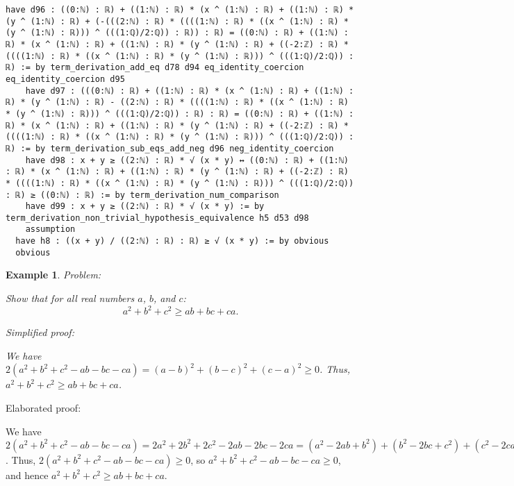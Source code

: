\documentclass{article}
\newtheorem{example}{Example}
\begin{document}
\begin{tcolorbox}[colback=white!10, width=\linewidth]
\begin{lstlisting}[language=Lean4]
    have d96 : ((0:ℕ) : ℝ) + ((1:ℕ) : ℝ) * (x ^ (1:ℕ) : ℝ) + ((1:ℕ) : ℝ) * (y ^ (1:ℕ) : ℝ) + (-(((2:ℕ) : ℝ) * ((((1:ℕ) : ℝ) * ((x ^ (1:ℕ) : ℝ) * (y ^ (1:ℕ) : ℝ))) ^ (((1:ℚ)/2:ℚ)) : ℝ)) : ℝ) = ((0:ℕ) : ℝ) + ((1:ℕ) : ℝ) * (x ^ (1:ℕ) : ℝ) + ((1:ℕ) : ℝ) * (y ^ (1:ℕ) : ℝ) + ((-2:ℤ) : ℝ) * ((((1:ℕ) : ℝ) * ((x ^ (1:ℕ) : ℝ) * (y ^ (1:ℕ) : ℝ))) ^ (((1:ℚ)/2:ℚ)) : ℝ) := by term_derivation_add_eq d78 d94 eq_identity_coercion eq_identity_coercion d95
    have d97 : (((0:ℕ) : ℝ) + ((1:ℕ) : ℝ) * (x ^ (1:ℕ) : ℝ) + ((1:ℕ) : ℝ) * (y ^ (1:ℕ) : ℝ) - ((2:ℕ) : ℝ) * ((((1:ℕ) : ℝ) * ((x ^ (1:ℕ) : ℝ) * (y ^ (1:ℕ) : ℝ))) ^ (((1:ℚ)/2:ℚ)) : ℝ) : ℝ) = ((0:ℕ) : ℝ) + ((1:ℕ) : ℝ) * (x ^ (1:ℕ) : ℝ) + ((1:ℕ) : ℝ) * (y ^ (1:ℕ) : ℝ) + ((-2:ℤ) : ℝ) * ((((1:ℕ) : ℝ) * ((x ^ (1:ℕ) : ℝ) * (y ^ (1:ℕ) : ℝ))) ^ (((1:ℚ)/2:ℚ)) : ℝ) := by term_derivation_sub_eqs_add_neg d96 neg_identity_coercion
    have d98 : x + y ≥ ((2:ℕ) : ℝ) * √ (x * y) ↔ ((0:ℕ) : ℝ) + ((1:ℕ) : ℝ) * (x ^ (1:ℕ) : ℝ) + ((1:ℕ) : ℝ) * (y ^ (1:ℕ) : ℝ) + ((-2:ℤ) : ℝ) * ((((1:ℕ) : ℝ) * ((x ^ (1:ℕ) : ℝ) * (y ^ (1:ℕ) : ℝ))) ^ (((1:ℚ)/2:ℚ)) : ℝ) ≥ ((0:ℕ) : ℝ) := by term_derivation_num_comparison
    have d99 : x + y ≥ ((2:ℕ) : ℝ) * √ (x * y) := by term_derivation_non_trivial_hypothesis_equivalence h5 d53 d98
    assumption
  have h8 : ((x + y) / ((2:ℕ) : ℝ) : ℝ) ≥ √ (x * y) := by obvious
  obvious

\end{lstlisting}
\end{tcolorbox}


\begin{example}
Problem:
\begin{tcolorbox}[colback=yellow!10, width=\linewidth]
Show that for all real numbers $a$, $b$, and $c$:
    $$a^2 + b^2 + c^2 \geq ab + bc + ca.$$
\end{tcolorbox}

Simplified proof:
\begin{tcolorbox}[colback=blue!10, width=\linewidth]
We have $2(a^2 + b^2 + c^2 - ab - bc - ca) = (a-b)^2 + (b-c)^2 + (c-a)^2 \ge 0$. Thus, $a^2 + b^2 + c^2 \geq ab + bc + ca$.
\end{tcolorbox}
\end{example}

Elaborated proof:
\begin{tcolorbox}[colback=green!10, width=\linewidth]
We have $2(a^2 + b^2 + c^2 - ab - bc - ca) = 2a^2 + 2b^2 + 2c^2 - 2ab - 2bc - 2ca = (a^2 - 2ab + b^2) + (b^2 - 2bc + c^2) + (c^2 - 2ca + a^2) = (a-b)^2 + (b-c)^2 + (c-a)^2 \ge 0$. Thus, $2(a^2 + b^2 + c^2 - ab - bc - ca) \ge 0$, so $a^2 + b^2 + c^2 - ab - bc - ca \ge 0$, and hence $a^2 + b^2 + c^2 \geq ab + bc + ca$.
\end{tcolorbox}
\end{document}
